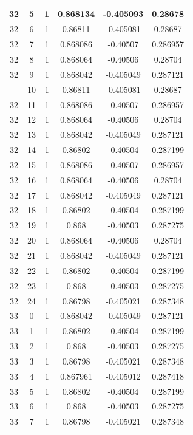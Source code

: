 \documentclass[12pt,a4paper]{article}
\numberwithin{equation}{section}
\numberwithin{figure}{section}
\numberwithin{table}{section}
\begin{document}
\begin{longtable}{|c|c|c|c|c|c|}
32 & 5 & 1 & 0.868134 & -0.405093 & 0.28678 \\ \hline
32 & 6 & 1 & 0.86811 & -0.405081 & 0.28687 \\ \hline
32 & 7 & 1 & 0.868086 & -0.40507 & 0.286957 \\ \hline
32 & 8 & 1 & 0.868064 & -0.40506 & 0.28704 \\ \hline
32 & 9 & 1 & 0.868042 & -0.405049 & 0.287121 \\ \hline
\pagebreak
32 & 10 & 1 & 0.86811 & -0.405081 & 0.28687 \\ \hline
32 & 11 & 1 & 0.868086 & -0.40507 & 0.286957 \\ \hline
32 & 12 & 1 & 0.868064 & -0.40506 & 0.28704 \\ \hline
32 & 13 & 1 & 0.868042 & -0.405049 & 0.287121 \\ \hline
32 & 14 & 1 & 0.86802 & -0.40504 & 0.287199 \\ \hline
32 & 15 & 1 & 0.868086 & -0.40507 & 0.286957 \\ \hline
32 & 16 & 1 & 0.868064 & -0.40506 & 0.28704 \\ \hline
32 & 17 & 1 & 0.868042 & -0.405049 & 0.287121 \\ \hline
32 & 18 & 1 & 0.86802 & -0.40504 & 0.287199 \\ \hline
32 & 19 & 1 & 0.868 & -0.40503 & 0.287275 \\ \hline
32 & 20 & 1 & 0.868064 & -0.40506 & 0.28704 \\ \hline
32 & 21 & 1 & 0.868042 & -0.405049 & 0.287121 \\ \hline
32 & 22 & 1 & 0.86802 & -0.40504 & 0.287199 \\ \hline
32 & 23 & 1 & 0.868 & -0.40503 & 0.287275 \\ \hline
32 & 24 & 1 & 0.86798 & -0.405021 & 0.287348 \\ \hline
33 & 0 & 1 & 0.868042 & -0.405049 & 0.287121 \\ \hline
33 & 1 & 1 & 0.86802 & -0.40504 & 0.287199 \\ \hline
33 & 2 & 1 & 0.868 & -0.40503 & 0.287275 \\ \hline
33 & 3 & 1 & 0.86798 & -0.405021 & 0.287348 \\ \hline
33 & 4 & 1 & 0.867961 & -0.405012 & 0.287418 \\ \hline
33 & 5 & 1 & 0.86802 & -0.40504 & 0.287199 \\ \hline
33 & 6 & 1 & 0.868 & -0.40503 & 0.287275 \\ \hline
33 & 7 & 1 & 0.86798 & -0.405021 & 0.287348 \\ \hline

\end{longtable}
\end{document}
